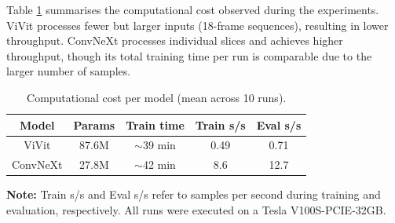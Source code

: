 
Table \ref{tab:computational_cost} summarises the computational cost observed during the experiments. ViVit processes fewer but larger inputs (18-frame sequences), resulting in lower throughput. ConvNeXt processes individual slices and achieves higher throughput, though its total training time per run is comparable due to the larger number of samples.

\begin{table}[h]
    \centering
    \caption{Computational cost per model (mean across 10 runs).}
    \renewcommand{\arraystretch}{1.5}
    \begin{tabular}{|c|c|c|c|c|}
        \hline
        \textbf{Model} & \textbf{Params} & \textbf{Train time} & \textbf{Train s/s} & \textbf{Eval s/s} \\ \hline
        ViVit & 87.6M & $\sim$39 min & 0.49 & 0.71 \\ \hline
        ConvNeXt & 27.8M & $\sim$42 min & 8.6 & 12.7 \\ \hline
    \end{tabular}
    \begin{center}
        \parbox{\columnwidth}{\centering \footnotesize \textbf{Note:} Train s/s and Eval s/s refer to samples per second during training and evaluation, respectively. All runs were executed on a Tesla V100S-PCIE-32GB.}
    \end{center}
    \label{tab:computational_cost}
\end{table}